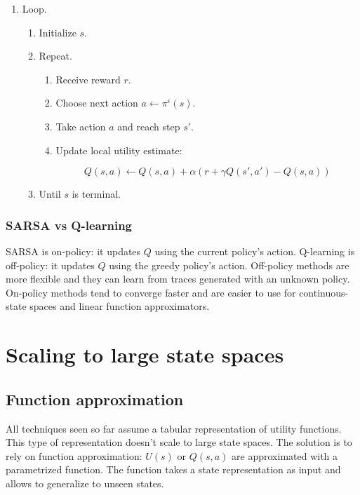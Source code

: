		\begin{enumerate}
			\item Loop.

				\begin{enumerate}
					\item Initialize $s$.
					\item Repeat.

						\begin{enumerate}
							\item Receive reward $r$.
							\item Choose next action $a\leftarrow\pi^\epsilon(s)$.
							\item Take action $a$ and reach step $s'$.
							\item Update local utility estimate:

								$$Q(s,a) \leftarrow Q(s,a) + \alpha(r+\gamma Q(s',a')- Q(s,a))$$

						\end{enumerate}

					\item Until $s$ is terminal.
				\end{enumerate}

		\end{enumerate}

		\subsubsection{SARSA vs Q-learning}
		SARSA is on-policy: it updates $Q$ using the current policy's action.
		Q-learning is off-policy: it updates $Q$ using the greedy policy's action.
		Off-policy methods are more flexible and they can learn from traces generated with an unknown policy.
		On-policy methods tend to converge faster and are easier to use for continuous-state spaces and linear function approximators.

\section{Scaling to large state spaces}

	\subsection{Function approximation}
	All techniques seen so far assume a tabular representation of utility functions.
	This type of representation doesn't scale to large state spaces.
	The solution is to rely on function approximation: $U(s)$ or $Q(s,a)$ are approximated with a parametrized function.
	The function takes a state representation as input and allows to generalize to unseen states.


